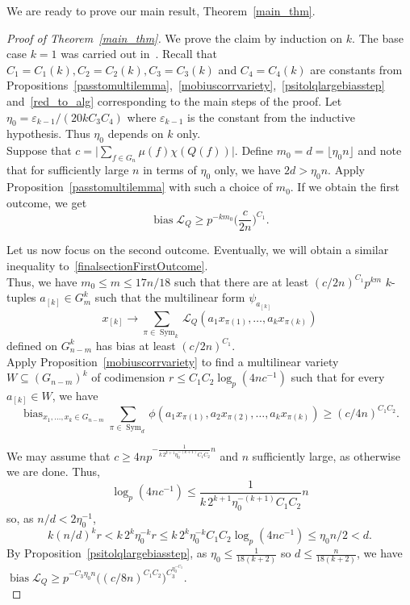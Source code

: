 \documentclass[a4paper,11pt]{article}
\theoremstyle{definition}
\newcommand{\on}[1]{
	\operatorname{#1}
}
\begin{document}
We are ready to prove our main result, Theorem~\ref{main_thm}.

\begin{proof}[Proof of Theorem~\ref{main_thm}]
   We prove the claim by induction on $k$. The base case $k = 1$ was carried out in~\cite{BL}. Recall that $C_1 = C_1(k), C_2 = C_2(k), C_3 = C_3(k)$ and $C_4 = C_4(k)$ are constants from Propositions~\ref{passtomultilemma},~\ref{mobiuscorrvariety},~\ref{psitolqlargebiasstep} and~\ref{red_to_alg} corresponding to the main steps of the proof. Let $\eta_0 = \varepsilon_{k-1}/(20kC_3C_4)$ where $\varepsilon_{k-1}$ is the constant from the inductive hypothesis. Thus $\eta_0$ depends on $k$ only.\\
   
   Suppose that $c = \Big|\sum_{f \in G_n} \mu(f)\chi(Q(f))\Big|$. Define $m_0 = d = \lfloor \eta_0 n\rfloor$ and note that for sufficiently large $n$ in terms of $\eta_0$ only, we have $2d > \eta_0 n$. Apply Proposition~\ref{passtomultilemma} with such a choice of $m_0$. If we obtain the first outcome, we get
   \begin{equation}
       \label{finalsectionFirstOutcome} 
       \on{bias} \mathcal{L}_Q \geq p^{-km_0}\Big(\frac{c}{2n}\Big)^{C_1}.
   \end{equation}

   Let us now focus on the second outcome. Eventually, we will obtain a similar inequality to~\eqref{finalsectionFirstOutcome}.\\
   
   Thus, we have $m_0 \leq m \leq 17n/18$ such that there are at least $(c/2n)^{C_1} p^{k m}$ $k$-tuples $a_{[k]}\in G_{m}^k$ such that the multilinear form $\psi_{a_{[k]}}$ 
    \[x_{[k]} \rightarrow \sum_{\pi \in \on{Sym}_k}\mathcal{L}_Q(a_1x_{\pi(1)},\ldots, a_k x_{\pi(k)})\]
    defined on $G_{n-m}^k$ has bias at least $(c/2n)^{C_1}$.\\

    Apply Proposition~\ref{mobiuscorrvariety} to find a multilinear variety $W \subseteq (G_{n - m})^k$ of codimension $r \leq C_1C_{2} \log_p(4nc^{-1})$ such that for every $a_{[k]} \in W$, we have
    \[\on{bias}_{x_1, \dots, x_k \in G_{n-m}} \sum_{\pi \in \on{Sym}_d}\phi(a_1x_{\pi(1)}, a_2 x_{\pi(2)},\dots, a_k x_{\pi(k)}) \geq (c/4n)^{C_1C_2}.\]

    We may assume that $c \geq 4n p^{ - \frac{1}{k\,2^{k+1} \eta_0^{-(k+1)} C_1C_2}n}$ and $n$ sufficiently large, as otherwise we are done. Thus, 
    \[\log_p(4nc^{-1}) \leq \frac{1}{k\,2^{k+1} \eta_0^{-(k+1)} C_1C_2}n\]
    so, as $n/d < 2\eta_0^{-1}$,
    \[k (n/d)^k r < k \,2^k\eta_0^{-k} r \leq k \,2^k\eta_0^{-k} C_1C_{2} \log_p(4nc^{-1}) \leq \eta_0n/2 < d.\]
    By Proposition~\ref{psitolqlargebiasstep}, as $\eta_0 \leq \frac{1}{18(k+2)}$ so $d \leq \frac{n}{18(k+2)}$, we have $\on{bias} \mathcal{L}_Q\ge p^{-C_3 \eta_0 n}  \Big((c/8n)^{C_1C_2}\Big)^{C_3^{\eta_0^{-C_3}}}$.\\


\end{proof}
\end{document}

